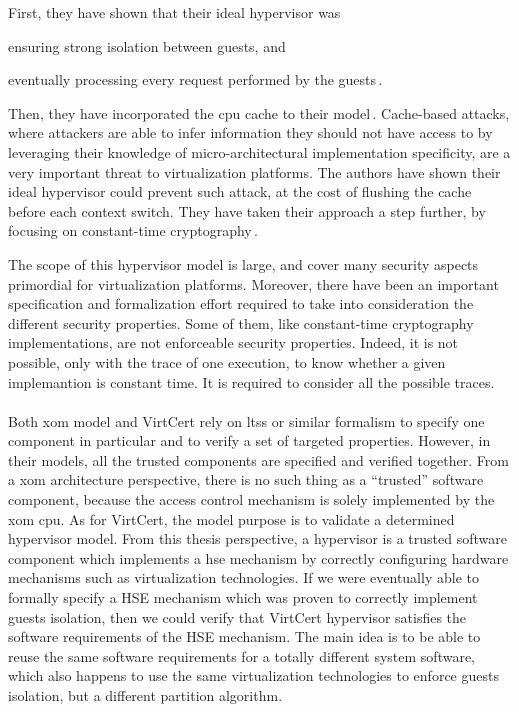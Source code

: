 First, they have shown that their ideal hypervisor was
%
\begin{inparaenum}[(1)]
\item ensuring strong isolation between guests, and
%
\item eventually processing every request performed by the
  guests\,\cite{barthe2011virtcert1}.
\end{inparaenum}
%
Then, they have incorporated the \ac{cpu} cache to their
model\,\cite{barthe2012virtcert2}.
%
Cache-based attacks, where attackers are able to infer information they should
not have access to by leveraging their knowledge of micro-architectural
implementation specificity, are a very important threat to virtualization
platforms.
%
The authors have shown their ideal hypervisor could prevent such attack, at the
cost of flushing the cache before each context switch.
%
They have taken their approach a step further, by focusing on constant-time
cryptography\,\cite{barthe2014virtcert3}.

The scope of this hypervisor model is large, and cover many security aspects
primordial for virtualization platforms.
%
Moreover, there have been an important specification and formalization effort
required to take into consideration the different security properties.
%
Some of them, like constant-time cryptography implementations, are not
enforceable security properties.
%
Indeed, it is not possible, only with the trace of one execution, to know
whether a given implemantion is constant time.
%
It is required to consider all the possible traces.

\paragraph{}
%
Both \ac{xom} model and VirtCert rely on \acp{lts} or similar formalism to
specify one component in particular and to verify a set of targeted properties.
%
However, in their models, all the trusted components are specified and verified
together.
%
From a \ac{xom} architecture perspective, there is no such thing as a
``trusted'' software component, because the access control mechanism is solely
implemented by the \ac{xom} \ac{cpu}.
%
As for VirtCert, the model purpose is to validate a determined hypervisor model.
%
From this thesis perspective, a hypervisor is a trusted software component which
implements a \ac{hse} mechanism by correctly configuring hardware mechanisms
such as virtualization technologies.
%
If we were eventually able to formally specify a HSE mechanism which was proven
to correctly implement guests isolation, then we could verify that VirtCert
hypervisor satisfies the software requirements of the HSE mechanism.
%
The main idea is to be able to reuse the same software requirements for a
totally different system software, which also happens to use the same
virtualization technologies to enforce guests isolation, but a different
partition algorithm.

